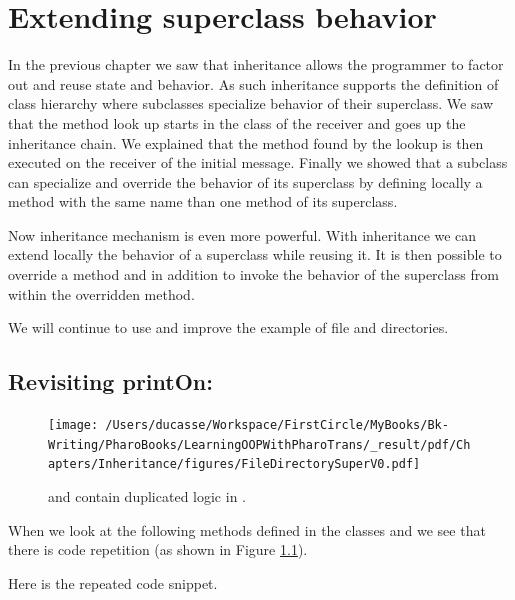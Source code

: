 \documentclass[10pt,twoside,english]{_support/latex/sbabook/sbabook}
\begin{document}
\frontmatter
\pagestyle{plain}

\tableofcontents*
\clearpage\listoffigures

\mainmatter

\chapter{Extending superclass behavior}
In the previous chapter we saw that inheritance allows the programmer to factor out and reuse state and behavior. As such inheritance supports the definition of class hierarchy where subclasses specialize behavior of their superclass. We saw that the method look up starts in the class of the receiver and goes up the inheritance chain. We explained that the method found by the lookup is then executed on the receiver of the initial message.
Finally we showed that a subclass can specialize and override the behavior of its superclass by defining locally a method with the same name than one method of its superclass. 

Now inheritance mechanism is even more powerful. With inheritance we can extend locally the behavior of a superclass while reusing it. It is then possible to override a method and in addition to invoke the behavior of the superclass from within the overridden method. 

We will continue to use and improve the example of file and directories.
\section{Revisiting printOn:}

\begin{figure}

\begin{center}
\texttt{[image: /Users/ducasse/Workspace/FirstCircle/MyBooks/Bk-Writing/PharoBooks/LearningOOPWithPharoTrans/\_result/pdf/Chapters/Inheritance/figures/FileDirectorySuperV0.pdf]}\caption{ and  contain duplicated logic in .\label{fig:FileDirectorySuperV0}}\end{center}
\end{figure}


When we look at the following  methods defined in the classes  and 
we see that there is code repetition (as shown in Figure \ref{fig:FileDirectorySuperV0}).

Here is the repeated code snippet.
\end{document}
